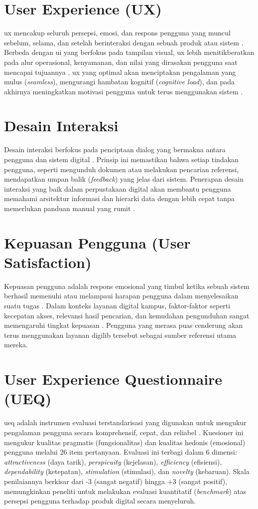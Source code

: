 \section{User Experience (UX)}
\gls{ux} mencakup seluruh persepsi, emosi, dan respons pengguna yang muncul sebelum, selama, dan setelah berinteraksi dengan sebuah produk atau sistem \cite{iso2019ergonomics}. Berbeda dengan \gls{ui} yang berfokus pada tampilan visual, \gls{ux} lebih menitikberatkan pada alur operasional, kenyamanan, dan nilai yang dirasakan pengguna saat mencapai tujuannya \cite{hassenzahl2006user}. \gls{ux} yang optimal akan menciptakan pengalaman yang mulus (\textit{seamless}), mengurangi hambatan kognitif (\textit{cognitive load}), dan pada akhirnya meningkatkan motivasi pengguna untuk terus menggunakan sistem \cite{garrett2011elements}.

\section{Desain Interaksi}
Desain interaksi berfokus pada penciptaan dialog yang bermakna antara pengguna dan sistem digital \cite{preece2015interaction}. Prinsip ini memastikan bahwa setiap tindakan pengguna, seperti mengunduh dokumen atau melakukan pencarian referensi, mendapatkan umpan balik (\textit{feedback}) yang jelas dari sistem. Penerapan desain interaksi yang baik dalam perpustakaan digital akan membantu pengguna memahami arsitektur informasi dan hierarki data dengan lebih cepat tanpa memerlukan panduan manual yang rumit \cite{cooper2014about}.

\section{Kepuasan Pengguna (User Satisfaction)}
Kepuasan pengguna adalah respons emosional yang timbul ketika sebuah sistem berhasil memenuhi atau melampaui harapan pengguna dalam menyelesaikan suatu tugas \cite{bhattacherjee2001understanding}. Dalam konteks layanan digital kampus, faktor-faktor seperti kecepatan akses, relevansi hasil pencarian, dan kemudahan pengunduhan sangat memengaruhi tingkat kepuasan \cite{mulyadi2023analisis}. Pengguna yang merasa puas cenderung akan terus menggunakan layanan \gls{digilib} tersebut sebagai sumber referensi utama mereka.

\section{User Experience Questionnaire (UEQ)}
\gls{ueq} adalah instrumen evaluasi terstandarisasi yang digunakan untuk mengukur pengalaman pengguna secara komprehensif, cepat, dan reliabel \cite{schrepp2014applying}. Kuesioner ini mengukur kualitas pragmatis (fungsionalitas) dan kualitas hedonis (emosional) pengguna melalui 26 item pertanyaan. Evaluasi ini terbagi dalam 6 dimensi: \textit{attractiveness} (daya tarik), \textit{perspicuity} (kejelasan), \textit{efficiency} (efisiensi), \textit{dependability} (ketepatan), \textit{stimulation} (stimulasi), dan \textit{novelty} (kebaruan). Skala penilaiannya berkisar dari -3 (sangat negatif) hingga +3 (sangat positif), memungkinkan peneliti untuk melakukan evaluasi kuantitatif (\textit{benchmark}) atas persepsi pengguna terhadap produk digital secara menyeluruh.
